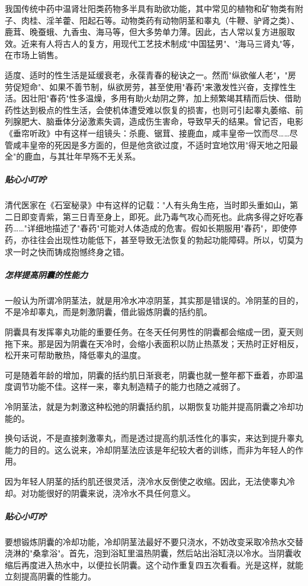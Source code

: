 我国传统中药中温肾壮阳类药物多半具有助欲功能，其中常见的植物和矿物类有附子、肉桂、淫羊藿、阳起石等。动物类药有动物阴茎和睾丸（牛鞭、驴肾之类）、鹿茸、晚蚕蛾、九香虫、海马等，但大多势单力薄。因此，古人常以复方进服取效。近来有人将古人的复方，用现代工艺技术制成"中国猛男"、"海马三肾丸"等，在市场上销售。

适度、适时的性生活是延缓衰老，永葆青春的秘诀之一。然而"纵欲催人老"，"房劳促短命"、如果不善节制，纵欲房劳，甚至使用"春药"来激发性兴奋，支撑性生活。因壮阳"春药"性多温燥，多用有助火劫阴之弊，加上频繁竭其精而后快、借助药性达到极点的性生活，会使机体遭受难以恢复的损害，也则可引起睾丸萎缩、前列腺肥大、脑垂体分泌激素失调，造成伤生害命，导致早夭的结果。曾记否，电影《垂帘听政》中有这样一组镜头：杀鹿、锯茸、接鹿血，咸丰皇帝一饮而尽……尽管咸丰皇帝的死因是多方面的，但是他贪欲过度，不适时宜地饮用"得天地之阳最全"的鹿血，与其壮年早殇不无关系。

\subparagraph{贴心小叮咛}

清代医家在《石室秘录》中有这样的记载："人有头角生疮，当时即头重如山，第二日即变青紫，第三日青至身上，即死。此乃毒气攻心而死也。此病多得之好吃春药……"详细地描述了"春药"可能对人体造成的危害。假如长期服用"春药"，即使停药，亦往往会出现性功能低下，甚至导致无法恢复的勃起功能障碍。所以，切莫为求一时之快而铸成抱憾终身之错。

\subparagraph{怎样提高阴囊的性能力}

一般认为所谓冷阴茎法，就是用冷水冲凉阴茎，其实那是错误的。冷阴茎的目的，不是冷却睾丸，而是刺激阴囊，借此锻炼阴囊的括约肌。

阴囊具有发挥睾丸功能的重要任务。在冬天任何男性的阴囊都会缩成一团，夏天则拖下来。那是因为阴囊在天冷时，会缩小表面积以防止热蒸发；天热时正好相反，松开来可帮助散热，降低睾丸的温度。

可是随着年龄的增加，阴囊的括约肌日渐衰老，阴囊也就一整年都下垂着，亦即温度调节功能不佳。这样一来，睾丸制造精子的能力也随之减弱了。

冷阴茎法，就是为刺激这种松弛的阴囊括约肌，以期恢复功能并提高阴囊之冷却功能的。

换句话说，不是直接刺激睾丸，而是透过提高约肌活性化的事实，来达到提升睾丸能力的目的。这么说来，冷却阴茎法应该是年纪较大者的训练，而非为年轻人的作用。

因为年轻人阴茎的括约肌还很灵活，浇冷水反倒使之收缩。因此，无法使睾丸冷却。对功能很好的阴囊来说，浇冷水不具任何意义。

\subparagraph{贴心小叮咛}

要想锻炼阴囊的冷却功能，冷却阴茎法最好不要只浇水，不妨改变采取冷热水交替浇淋的"桑拿浴"。首先，泡到浴缸里温热阴囊，然后站出浴缸浇以冷水。当阴囊收缩后再度进入热水中，以便拉长阴囊。这个动作重复四五次看看。光是这样，就能立刻提高阴囊的性能力。


